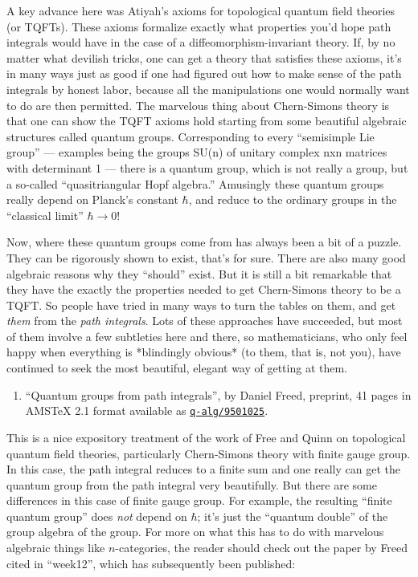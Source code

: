 \documentclass{article}
\def\tightlist{}
\begin{document}
A key advance here was Atiyah's axioms for topological quantum field
theories (or TQFTs). These axioms formalize exactly what properties
you'd hope path integrals would have in the case of a
diffeomorphism-invariant theory. If, by no matter what devilish tricks,
one can get a theory that satisfies these axioms, it's in many ways just
as good if one had figured out how to make sense of the path integrals
by honest labor, because all the manipulations one would normally want
to do are then permitted. The marvelous thing about Chern-Simons theory
is that one can show the TQFT axioms hold starting from some beautiful
algebraic structures called quantum groups. Corresponding to every
``semisimple Lie group'' --- examples being the groups SU(n) of unitary
complex nxn matrices with determinant 1 --- there is a quantum group,
which is not really a group, but a so-called ``quasitriangular Hopf
algebra.'' Amusingly these quantum groups really depend on Planck's
constant \(\hbar\), and reduce to the ordinary groups in the ``classical
limit'' \(\hbar \to 0\)!

Now, where these quantum groups come from has always been a bit of a
puzzle. They can be rigorously shown to exist, that's for sure. There
are also many good algebraic reasons why they ``should'' exist. But it
is still a bit remarkable that they have the exactly the properties
needed to get Chern-Simons theory to be a TQFT. So people have tried in
many ways to turn the tables on them, and get \emph{them} from the
\emph{path integrals}. Lots of these approaches have succeeded, but most
of them involve a few subtleties here and there, so mathematicians, who
only feel happy when everything is *blindingly obvious* (to them, that
is, not you), have continued to seek the most beautiful, elegant way of
getting at them.

\begin{enumerate}
\def\labelenumi{\arabic{enumi})}
\tightlist
\item
  ``Quantum groups from path integrals'', by Daniel Freed, preprint, 41
  pages in AMSTeX 2.1 format available as
  \href{http://xxx.lanl.gov/abs/q-alg/9501025}{\texttt{q-alg/9501025}}.
\end{enumerate}

This is a nice expository treatment of the work of Free and Quinn on
topological quantum field theories, particularly Chern-Simons theory
with finite gauge group. In this case, the path integral reduces to a
finite sum and one really can get the quantum group from the path
integral very beautifully. But there are some differences in this case
of finite gauge group. For example, the resulting ``finite quantum
group'' does \emph{not} depend on \(\hbar\); it's just the ``quantum
double'' of the group algebra of the group. For more on what this has to
do with marvelous algebraic things like \(n\)-categories, the reader
should check out the paper by Freed cited in ``week12'', which has
subsequently been published:
\end{document}

